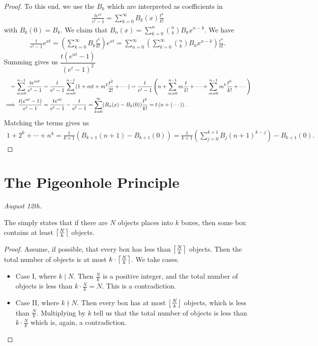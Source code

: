 \begin{proof}
    To this end, we use the  $B_{k}$ which are interpreted as coefficients in
    \begin{align}
        \frac{te^{xt}}{e^{t}-1} = \sum_{k=0}^{\infty} B_{k}(x) \frac{t^{k}}{k!}
    \end{align}
    with $B_{k}(0) = B_{k}$. We claim that $B_{n}(x) = \sum_{k=0}^{n} \binom{n}{k} B_{k} x^{n-k}$. We have
    \begin{align}
        \frac{t}{e^{t}-1} e^{xt} = \left( \sum_{k=0}^{\infty} B_{k} \frac{t^{k}}{k!} \right)e^{xt} = \sum_{n=0}^{\infty} \left( \sum_{k=0}^{\infty} \binom{n}{k} B_{k} x^{n-k} \right) \frac{t^{n}}{n!}.
    \end{align}
    Summing gives us $\dfrac{t(e^{nt}-1)}{(e^{t}-1)^{2}}$
    \begin{align}
        = \sum_{m=0}^{n-1} \frac{te^{mt}}{e^{t}-1} &= \frac{t}{e^{t}-1}\sum_{m=0}^{n-1} (1+mt+m^{2}\frac{t^{2}}{2!}+\cdots) = \frac{t}{e^{t}-1}\left( n + \sum_{m=0}^{n-1} m \frac{t}{1!} + \cdots + \sum_{m=0}^{n-1} m^{k} \frac{t^{k}}{k!} + \cdots \right) \notag \\
        \implies \frac{t(e^{nt}-1)}{e^{t}-1} &= \frac{te^{nt}}{e^{t}-1} - \frac{t}{e^{t}-1} = \sum_{k=0}^{\infty} (B_{n}(x)-B_{k}(0)) \frac{t^{k}}{k!} = t \left( n + (\cdots) \right).
    \end{align}
    Matching the terms gives us
    \begin{align}
        1 + 2^{k} + \cdots + n^{k} = \frac{1}{k+1} \left( B_{k+1}(n+1)-B_{k+1}(0) \right) = \frac{1}{k+1} \left( \sum_{j=0}^{k+1} B_{j}(n+1)^{k-j} \right) - B_{k+1}(0).
    \end{align}
\end{proof}

\section{The Pigeonhole Principle}
\textit{August 12th.}

The  simply states that if there are $N$ objects places into $k$ boxes, then some box contains at least $\left\lceil \frac{N}{k} \right\rceil$ objects.

\begin{proof}
    Assume, if possible, that every box has less than $\left\lceil \frac{N}{k} \right\rceil$ objects. Then the total number of objects is at most $k \cdot \left\lceil \frac{N}{k} \right\rceil$. We take cases.
    \begin{itemize}
        \item Case I, where $k \mid N$. Then $\frac{N}{k}$ is a positive integer, and the total number of objects is less than $k \cdot \frac{N}{k} = N$. This is a contradiction.
        \item Case II, where $k \nmid N$. Then every box has at most $\left\lfloor \frac{N}{k} \right\rfloor$ objects, which is less than $\frac{N}{k}$. Multiplying by $k$ tell us that the total number of objects is less than $k \cdot \frac{N}{k}$ which is, again, a contradiction.
    \end{itemize}
\end{proof}

